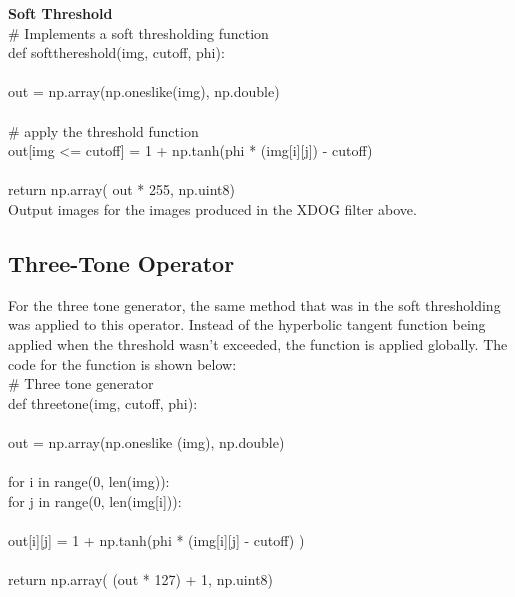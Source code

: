 \documentclass{article}
\begin{document}
	\smallskip
	
	\textbf{Soft Threshold}\\
	
	\noindent \# Implements a soft thresholding function\\
	def soft\textunderscore thereshold(img, cutoff, phi):\\
	\\
	\indent out = np.array(np.ones\textunderscore like(img), np.double)\\
	\\
	\indent \# apply the threshold function\\
	\indent out[img <= cutoff] = 1 + np.tanh(phi * (img[i][j]) - cutoff)\\
	\\
	\indent return np.array( out * 255, np.uint8)\\
	
	Output images for the images produced in the XDOG filter above.\\
	
%		
%		
	
	\subsection{Three-Tone Operator}
	
	For the three tone generator, the same method that was in the soft thresholding was applied to this operator. Instead of the hyperbolic tangent function being applied when the threshold wasn't exceeded, the function is applied globally. The code for the function is shown below:\\
	
	\noindent \# Three tone generator\\
	\noindent def three\textunderscore tone(img, cutoff, phi):\\
	\\
	\indent out = np.array(np.ones\textunderscore like (img), np.double)\\
	\\
	\indent for i in range(0, len(img)):\\
	\indent \indent for j in range(0, len(img[i])):\\
	\\
	\indent \indent \indent out[i][j] = 1 + np.tanh(phi * (img[i][j] - cutoff) )\\
	\\
	\indent return np.array( (out * 127) + 1, np.uint8)\\
	
\end{document}

